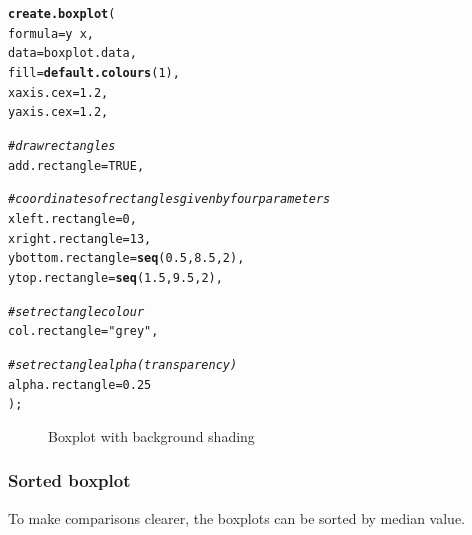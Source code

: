 \documentclass[letterpaper]{report}\usepackage[]{graphicx}\usepackage[]{color}
\makeatletter
\newcommand{\hlnum}[1]{\textcolor[rgb]{0.686,0.059,0.569}{#1}}%
\newcommand{\hlstr}[1]{\textcolor[rgb]{0.192,0.494,0.8}{#1}}%
\newcommand{\hlcom}[1]{\textcolor[rgb]{0.678,0.584,0.686}{\textit{#1}}}%
\newcommand{\hlopt}[1]{\textcolor[rgb]{0,0,0}{#1}}%
\newcommand{\hlstd}[1]{\textcolor[rgb]{0.345,0.345,0.345}{#1}}%
\newcommand{\hlkwc}[1]{\textcolor[rgb]{0.333,0.667,0.333}{#1}}%
\newcommand{\hlkwd}[1]{\textcolor[rgb]{0.737,0.353,0.396}{\textbf{#1}}}%
\newenvironment{kframe}{%
 \def\at@end@of@kframe{}%
 \ifinner\ifhmode%
  \def\at@end@of@kframe{\end{minipage}}%
  \begin{minipage}{\columnwidth}%
 \fi\fi%
 \def\FrameCommand##1{\hskip\@totalleftmargin \hskip-\fboxsep
 \colorbox{shadecolor}{##1}\hskip-\fboxsep
     \hskip-\linewidth \hskip-\@totalleftmargin \hskip\columnwidth}%
 \MakeFramed {\advance\hsize-\width
   \@totalleftmargin\z@ \linewidth\hsize
   \@setminipage}}%
 {\par\unskip\endMakeFramed%
 \at@end@of@kframe}
\newenvironment{knitrout}{}{} %
\makeatother
\begin{document}
\begin{knitrout}
\color{fgcolor}\begin{kframe}
\begin{alltt}
\hlkwd{create.boxplot}\hlstd{(}
    \hlkwc{formula} \hlstd{= y} \hlopt{~} \hlstd{x,}
    \hlkwc{data} \hlstd{= boxplot.data,}
    \hlkwc{fill} \hlstd{=} \hlkwd{default.colours}\hlstd{(}\hlnum{1}\hlstd{),}
    \hlkwc{xaxis.cex} \hlstd{=} \hlnum{1.2}\hlstd{,}
    \hlkwc{yaxis.cex} \hlstd{=} \hlnum{1.2}\hlstd{,}

    \hlcom{# draw rectangles}
    \hlkwc{add.rectangle} \hlstd{=} \hlnum{TRUE}\hlstd{,}

    \hlcom{# coordinates of rectangles given by four parameters}
    \hlkwc{xleft.rectangle} \hlstd{=} \hlnum{0}\hlstd{,}
    \hlkwc{xright.rectangle} \hlstd{=} \hlnum{13}\hlstd{,}
    \hlkwc{ybottom.rectangle} \hlstd{=} \hlkwd{seq}\hlstd{(}\hlnum{0.5}\hlstd{,} \hlnum{8.5}\hlstd{,} \hlnum{2}\hlstd{),}
    \hlkwc{ytop.rectangle} \hlstd{=} \hlkwd{seq}\hlstd{(}\hlnum{1.5}\hlstd{,} \hlnum{9.5}\hlstd{,} \hlnum{2}\hlstd{),}

    \hlcom{# set rectangle colour}
    \hlkwc{col.rectangle} \hlstd{=} \hlstr{"grey"}\hlstd{,}

    \hlcom{# set rectangle alpha (transparency)}
    \hlkwc{alpha.rectangle} \hlstd{=} \hlnum{0.25}
    \hlstd{);}
\end{alltt}
\end{kframe}\begin{figure}

{\centering {} 

}

\caption[Boxplot with background shading]{Boxplot with background shading\label{fig:boxplot3}}
\end{figure}


\end{knitrout}

\subsubsection{Sorted boxplot}
To make comparisons clearer, the boxplots can be sorted by median value.
\end{document}
